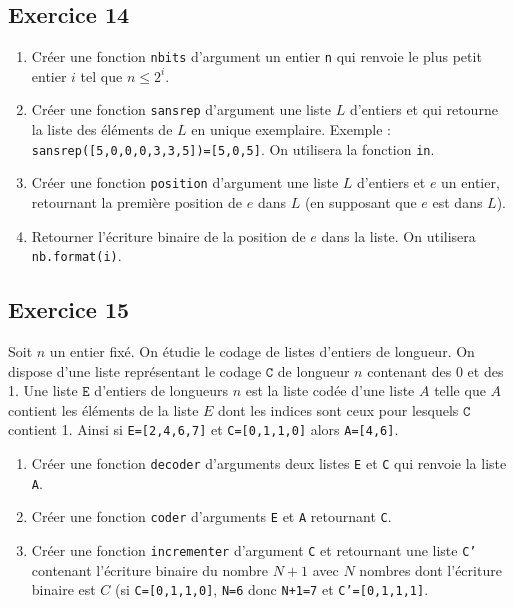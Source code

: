 \documentclass[10pt,fleqn]{article} %
\begin{document}
\begin{multicols}{2}
\subsection*{Exercice 14}
\begin{enumerate}
\item Créer une fonction \texttt{nbits} d'argument un entier \texttt{n} qui renvoie le plus petit entier $i$ tel que $n \leq 2^i$. 
\item Créer une fonction \texttt{sansrep} d'argument une liste $L$ d'entiers et qui retourne la liste des éléments de $L$ en unique exemplaire. Exemple : \texttt{sansrep([5,0,0,0,3,3,5])=[5,0,5]}. On utilisera la fonction \texttt{in}.
\item Créer une fonction \texttt{position} d'argument une liste $L$ d'entiers et $e$ un entier, retournant la première position de $e$ dans $L$ (en supposant que $e$ est dans $L$).
\item Retourner l'écriture binaire de la position de $e$ dans la liste. On utilisera \texttt{nb.format(i)}.

\end{enumerate}

\subsection*{Exercice 15}
Soit $n$ un entier fixé. On étudie le codage de listes d'entiers de longueur.  On dispose d'une liste représentant le codage $\texttt{C}$ de longueur $n$ contenant des 0 et des 1.  Une liste $\texttt{E}$ d'entiers de longueurs $n$ est la liste codée d'une liste $A$ telle que $A$ contient les éléments de la liste $E$ dont les indices sont ceux pour lesquels $\texttt{C}$ contient 1. 
Ainsi si \texttt{E=[2,4,6,7]} et \texttt{C=[0,1,1,0]} alors \texttt{A=[4,6]}.
\begin{enumerate}
\item Créer une fonction \texttt{decoder} d'arguments deux listes \texttt{E} et \texttt{C} qui renvoie la liste \texttt{A}.
\item Créer une fonction \texttt{coder} d'arguments \texttt{E} et \texttt{A} retournant \texttt{C}.
\item Créer une fonction \texttt{incrementer} d'argument \texttt{C} et retournant une liste \texttt{C'} contenant l'écriture binaire du nombre $N+1$ avec $N$ nombres dont l'écriture binaire est $C$ (si \texttt{C=[0,1,1,0]}, \texttt{N=6} donc \texttt{N+1=7} et \texttt{C'=[0,1,1,1]}.
\end{enumerate}



\end{multicols}
\end{document}
